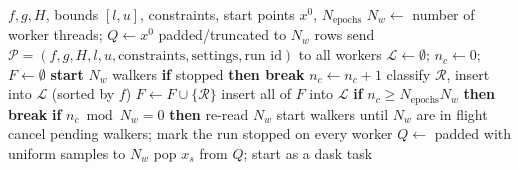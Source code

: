 \documentclass[11pt]{article}
\newcommand{\code}[1]{\texttt{#1}}
\begin{document}
\begin{algorithm}[H]
\caption{Coordinator (\code{HGDL.optimize}, \code{\_run\_walkers})}\label{alg:coordinator}
\begin{algorithmic}[1]
\Require $f, g, H$, bounds $[l,u]$, constraints, start points $x^0$, $N_{\text{epochs}}$
\State $N_w \gets$ number of worker threads; $Q \gets x^0$ padded/truncated to $N_w$ rows
\State send $\mathcal{P} = (f, g, H, l, u, \text{constraints}, \text{settings}, \text{run id})$ to all workers
\State $\mathcal{L} \gets \emptyset$; $n_c \gets 0$; $F \gets \emptyset$ 
\State \textbf{start} $N_w$ walkers 
  \State \textbf{if} stopped \textbf{then break}
  \State $n_c \gets n_c + 1$
    \State classify $\mathcal{R}$, insert into $\mathcal{L}$ (sorted by $f$)
   \State $F \gets F \cup \{\mathcal{R}\}$
  \EndIf
   \State insert all of $F$ into $\mathcal{L}$ 
  \EndIf
  \State \textbf{if} $n_c \ge N_{\text{epochs}} N_w$ \textbf{then break}
  \State \textbf{if} $n_c \bmod N_w = 0$ \textbf{then} re-read $N_w$
  \State start walkers until $N_w$ are in flight
\EndFor
\State cancel pending walkers; mark the run stopped on every worker
\Statex
{}
   \State $Q \gets$  padded with uniform samples to $N_w$
  \EndIf
  \State pop $x_s$ from $Q$; start  as a dask task
\EndProcedure
\end{algorithmic}
\end{algorithm}
\end{document}
